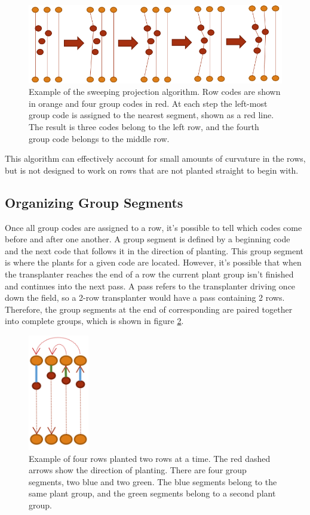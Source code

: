 \begin{figure}[htb]
	\centering
    \includegraphics[width=6in]{figures/sweeping_algorithm.png}
    \caption[Sweeping projection algorithm]{Example of the sweeping projection algorithm. Row codes are shown in orange and four group codes in red.  At each step the left-most group code is assigned to the nearest segment, shown as a red line.  The result is three codes belong to the left row, and the fourth group code belongs to the middle row.}
    \label{figure:sweeping_algorithm}
\end{figure}

This algorithm can effectively account for small amounts of curvature in the rows, but is not designed to work on rows that are not planted straight to begin with.

\subsection{Organizing Group Segments}

Once all group codes are assigned to a row, it's possible to tell which codes come before and after one another.  A group segment is defined by a beginning code and the next code that follows it in the direction of planting.  This group segment is where the plants for a given code are located.  However, it's possible that when the transplanter reaches the end of a row the current plant group isn't finished and continues into the next pass.  A pass refers to the transplanter driving once down the field, so a 2-row transplanter would have a pass containing 2 rows.  Therefore, the group segments at the end of corresponding are paired together into complete groups, which is shown in figure \ref{figure:group_segments}.

\begin{figure}[htb]
	\centering
    \includegraphics[height=2in]{figures/group_segments.png}
    \caption[Group segments]{Example of four rows planted two rows at a time.  The red dashed arrows show the direction of planting.  There are four group segments, two blue and two green.  The blue segments belong to the same plant group, and the green segments belong to a second plant group.}
    \label{figure:group_segments}
\end{figure}

